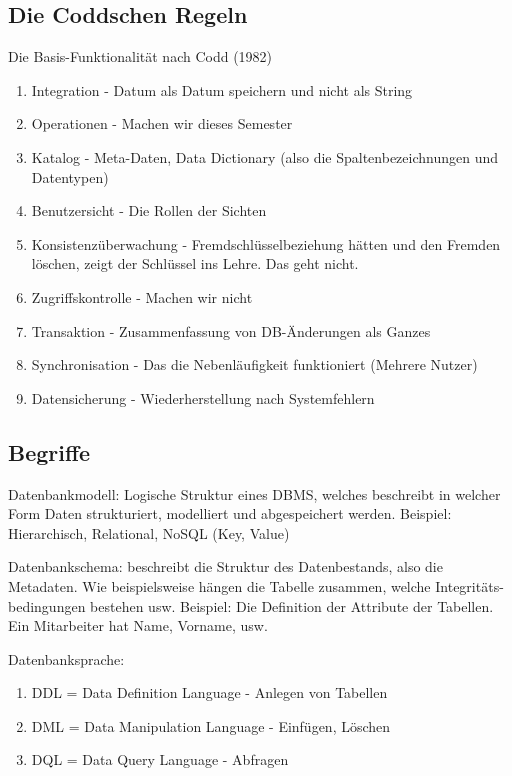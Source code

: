 \documentclass[a4paper]{article}
\begin{document}
\subsection{Die Coddschen Regeln}

Die Basis-Funktionalität nach Codd (1982)

\begin{enumerate}
    \item Integration - Datum als Datum speichern und nicht als String
    \item Operationen - Machen wir dieses Semester
    \item Katalog - Meta-Daten, Data Dictionary (also die Spaltenbezeichnungen und Datentypen)
    \item Benutzersicht - Die Rollen der Sichten
    \item Konsistenzüberwachung - Fremdschlüsselbeziehung hätten und den Fremden löschen, zeigt der Schlüssel ins Lehre. Das geht nicht.
    \item Zugriffskontrolle - Machen wir nicht
    \item Transaktion - Zusammenfassung von DB-Änderungen als Ganzes
    \item Synchronisation - Das die Nebenläufigkeit funktioniert (Mehrere Nutzer)
    \item Datensicherung - Wiederherstellung nach Systemfehlern
\end{enumerate}

\subsection{Begriffe}

Datenbankmodell: Logische Struktur eines DBMS, welches beschreibt in welcher Form Daten strukturiert, modelliert und abgespeichert werden. Beispiel: Hierarchisch, Relational, NoSQL (Key, Value)

Datenbankschema: beschreibt die Struktur des Datenbestands, also die Metadaten. Wie beispielsweise hängen die Tabelle zusammen, welche Integritäts-bedingungen bestehen usw. Beispiel: Die Definition der Attribute der Tabellen. Ein Mitarbeiter hat Name, Vorname, usw.

Datenbanksprache: 

\begin{enumerate}
    \item DDL = Data Definition Language - Anlegen von Tabellen
    \item DML = Data Manipulation Language - Einfügen, Löschen
    \item DQL = Data Query Language - Abfragen
\end{enumerate}
\end{document}
